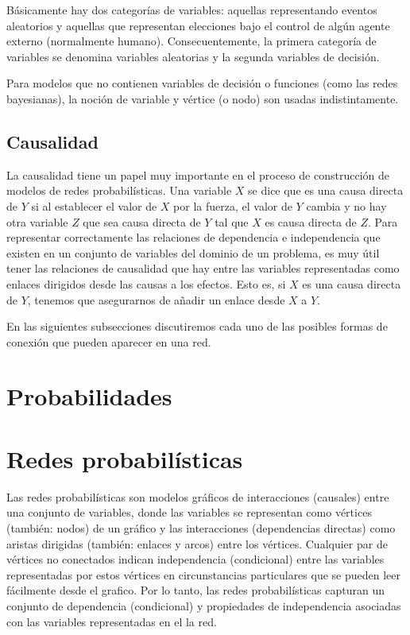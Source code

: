 Básicamente hay dos categorías de variables: aquellas representando eventos aleatorios y aquellas que representan elecciones bajo el 
control de algún agente externo (normalmente humano). Consecuentemente, la primera categoría de variables se denomina variables aleatorias y la segunda 
variables de decisión.

Para modelos que no contienen variables de decisión o funciones (como las redes bayesianas), la noción de variable y vértice (o nodo) son usadas 
indistintamente.  

\subsection{Causalidad}
La causalidad tiene un papel muy importante en el proceso de construcción de modelos de redes probabilísticas. Una variable $X$ se dice que es 
una causa directa de $Y$ si al establecer el valor de $X$ por la fuerza, el valor de $Y$ cambia y no hay otra variable $Z$ que sea causa directa de 
$Y$ tal que $X$ es causa directa de $Z$. Para representar correctamente las relaciones de dependencia e independencia que existen en un conjunto de variables 
del dominio de un problema, es muy útil tener las relaciones de causalidad que hay entre las variables representadas como enlaces dirigidos desde las causas 
a los efectos. Esto es, si $X$ es una causa directa de $Y$, tenemos que asegurarnos de añadir un enlace desde $X$ a $Y$. 

En las siguientes subsecciones discutiremos cada uno de las posibles formas de conexión que pueden aparecer en una red.

\section{Probabilidades} 
\section{Redes probabilísticas}
Las redes probabilísticas son modelos gráficos de interacciones (causales) entre una
conjunto de variables, donde las variables se representan como vértices (también: nodos)
de un gráfico y las interacciones (dependencias directas) como aristas dirigidas (también:
enlaces y arcos) entre los vértices. Cualquier par de vértices no conectados indican 
independencia (condicional) entre las variables representadas
por estos vértices en circunstancias particulares que se pueden leer fácilmente desde el
grafico. Por lo tanto, las redes probabilísticas capturan un conjunto de dependencia (condicional)
y propiedades de independencia asociadas con las variables representadas en el
la red.

